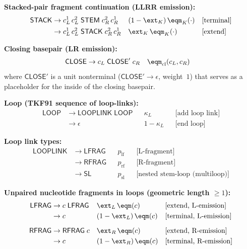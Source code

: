 \medskip
\noindent\textbf{Stacked-pair fragment continuation (LLRR emission):}
\begin{align}
\mathsf{STACK} &\to c_L^1\, c_L^2\;\mathsf{STEM}\;c_R^2\, c_R^1
  && (1-\ext_K)\, \eqm_K(\cdot)
  && \text{[terminal]}
  \label{eq:stack-term} \\
&\to c_L^1\, c_L^2\;\mathsf{STACK}\;c_R^2\, c_R^1
  && \ext_K\, \eqm_K(\cdot)
  && \text{[extend]}
  \label{eq:stack-ext}
\end{align}

\noindent\textbf{Closing basepair (LR emission):}
\begin{align}
\mathsf{CLOSE} &\to c_L\;\mathsf{CLOSE}'\;c_R
  && \eqm_{\mathrm{cl}}(c_L, c_R)
  \label{eq:close}
\end{align}
where $\mathsf{CLOSE}'$ is a unit nonterminal ($\mathsf{CLOSE}' \to \epsilon$, weight~$1$)
that serves as a placeholder for the inside of the closing basepair.

\noindent\textbf{Loop (TKF91 sequence of loop-links):}
\begin{align}
\mathsf{LOOP} &\to \mathsf{LOOPLINK}\;\mathsf{LOOP}
  && \kappa_L
  && \text{[add loop link]}
  \label{eq:loop-link} \\
&\to \epsilon
  && 1 - \kappa_L
  && \text{[end loop]}
  \label{eq:loop-end}
\end{align}

\noindent\textbf{Loop link types:}
\begin{align}
\mathsf{LOOPLINK} &\to \mathsf{LFRAG}
  && p_{\mathrm{lf}}
  && \text{[L-fragment]}
  \label{eq:loop-lfrag} \\
&\to \mathsf{RFRAG}
  && p_{\mathrm{rf}}
  && \text{[R-fragment]}
  \label{eq:loop-rfrag} \\
&\to \mathsf{SL}
  && p_{\mathrm{sl}}
  && \text{[nested stem-loop (multiloop)]}
  \label{eq:loop-sl}
\end{align}

\noindent\textbf{Unpaired nucleotide fragments in loops
(geometric length $\geq 1$):}
\begin{align}
\mathsf{LFRAG} &\to c\;\mathsf{LFRAG}
  && \ext_L\, \eqm(c)
  && \text{[extend, L-emission]}
  \label{eq:lfrag-ext} \\
&\to c
  && (1-\ext_L)\, \eqm(c)
  && \text{[terminal, L-emission]}
  \label{eq:lfrag-term} \\[6pt]
\mathsf{RFRAG} &\to \mathsf{RFRAG}\;c
  && \ext_R\, \eqm(c)
  && \text{[extend, R-emission]}
  \label{eq:rfrag-ext} \\
&\to c
  && (1-\ext_R)\, \eqm(c)
  && \text{[terminal, R-emission]}
  \label{eq:rfrag-term}
\end{align}

